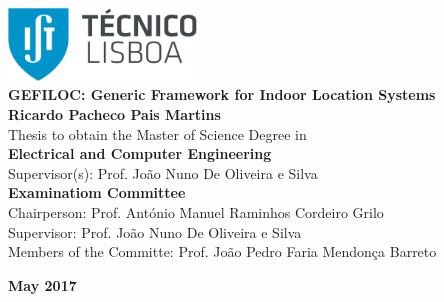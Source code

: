 \setcounter{page}{1} 


\thispagestyle{empty}
\begin{flushleft} ~\\ \vspace{-12mm} \hspace{-12mm}  \includegraphics[width=50mm]{Figures/Cover/istnewlogo.jpg} 
\vspace{10mm}
\\ \vspace{50mm} %
 \vspace{5mm}
\centering
\LARGE \textbf{GEFILOC: Generic Framework for Indoor Location Systems}
\\ \vspace{15mm}
\Large \textbf{Ricardo Pacheco Pais Martins} \\
\vspace{12mm}
\large Thesis to obtain the Master of Science Degree in
\\ \vspace{2mm}
\LARGE \textbf{Electrical and Computer Engineering}
\\ \vspace{10mm}
\large Supervisor(s): Prof. João Nuno De Oliveira e Silva
\\ \vspace{15mm}
\Large \textbf{Examinatiom Committee}
\\ \vspace{5mm}
\large Chairperson:	Prof. António Manuel Raminhos Cordeiro Grilo  \\
\large Supervisor: Prof. João Nuno De Oliveira e Silva\\
\large Members of the Committe: Prof. João Pedro Faria Mendonça Barreto
 
\vspace{15mm}

\Large \textbf{May 2017} \\
\let\thepage\relax
\end{flushleft}
\pagebreak


